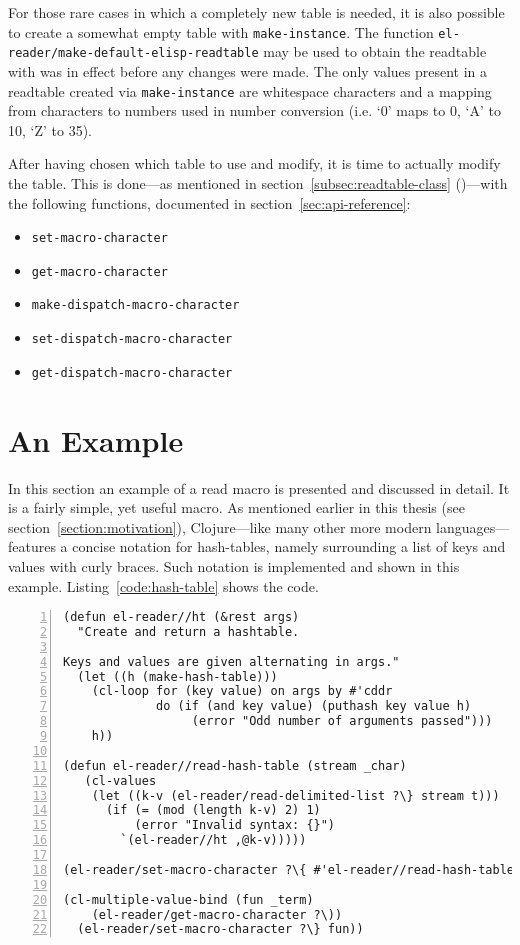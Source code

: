 \documentclass[a4paper,10pt,twoside]{report}
\newcommand{\fun}[1]{\texttt{#1}}
\begin{document}
For those rare cases in which a completely new table is needed, it is also
possible to create a somewhat empty table with \fun{make-instance}.\cite[Section
4, ``Making New Objects'']{eieio} The function
\fun{el-reader/make-default-elisp-readtable} may be used to obtain the readtable
with was in effect before any changes were made.  The only values present in a
readtable created via \fun{make-instance} are whitespace characters and a
mapping from characters to numbers used in number conversion (i.e. `0' maps to
0, `A' to 10, `Z' to 35).

After having chosen which table to use and modify, it is time to actually modify
the table.  This is done---as mentioned in section~\ref{subsec:readtable-class}
()---with the following functions, documented in
section~\ref{sec:api-reference}:

\begin{itemize}
\item \fun{set-macro-character} 
\item \fun{get-macro-character}
\item \fun{make-dispatch-macro-character}
\item \fun{set-dispatch-macro-character}
\item \fun{get-dispatch-macro-character}
\end{itemize}

\section{An Example}
\label{sec:example}

In this section an example of a read macro is presented and discussed in detail.
It is a fairly simple, yet useful macro.  As mentioned earlier in this thesis
(see section~\ref{section:motivation}), Clojure---like many other more modern
languages---features a concise notation for hash-tables, namely surrounding a
list of keys and values with curly braces.  Such notation is implemented and
shown in this example.  Listing~\ref{code:hash-table} shows the code.

\begin{lstlisting}[style=lispcode,label={code:hash-table},caption={Create syntax
    for hash-tables.},numbers=left]
(defun el-reader//ht (&rest args)
  "Create and return a hashtable.

Keys and values are given alternating in args."
  (let ((h (make-hash-table)))
    (cl-loop for (key value) on args by #'cddr
             do (if (and key value) (puthash key value h)
                  (error "Odd number of arguments passed")))
    h))

(defun el-reader//read-hash-table (stream _char)
   (cl-values
    (let ((k-v (el-reader/read-delimited-list ?\} stream t)))
      (if (= (mod (length k-v) 2) 1)
          (error "Invalid syntax: {}")
        `(el-reader//ht ,@k-v)))))

(el-reader/set-macro-character ?\{ #'el-reader//read-hash-table)

(cl-multiple-value-bind (fun _term)
    (el-reader/get-macro-character ?\))
  (el-reader/set-macro-character ?\} fun))
\end{lstlisting}
\end{document}
